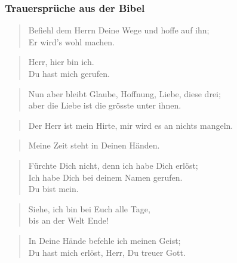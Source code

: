 \documentclass[ngerman,a4paper,11pt]{scrreprt}
\begin{document}
\subsubsection*{Trauersprüche aus der Bibel}
\label{sec-2-1-2-2-5}

\begin{verse}
Befiehl dem Herrn Deine Wege und hoffe auf ihn; \\
Er wird's wohl machen. \\
\end{verse}

\begin{verse}
Herr, hier bin ich. \\
Du hast mich gerufen. \\
\end{verse}

\begin{verse}
Nun aber bleibt Glaube, Hoffnung, Liebe, diese drei; \\
aber die Liebe ist die grösste unter ihnen. \\
\end{verse}

\begin{verse}
Der Herr ist mein Hirte, mir wird es an nichts mangeln. \\
\end{verse}

\begin{verse}
Meine Zeit steht in Deinen Händen. \\
\end{verse}

\begin{verse}
Fürchte Dich nicht, denn ich habe Dich erlöst; \\
Ich habe Dich bei deinem Namen gerufen. \\
Du bist mein. \\
\end{verse}

\begin{verse}
Siehe, ich bin bei Euch alle Tage, \\
bis an der Welt Ende! \\
\end{verse}

\begin{verse}
In Deine Hände befehle ich meinen Geist; \\
Du hast mich erlöst, Herr, Du treuer Gott. \\
\end{verse}
\end{document}
